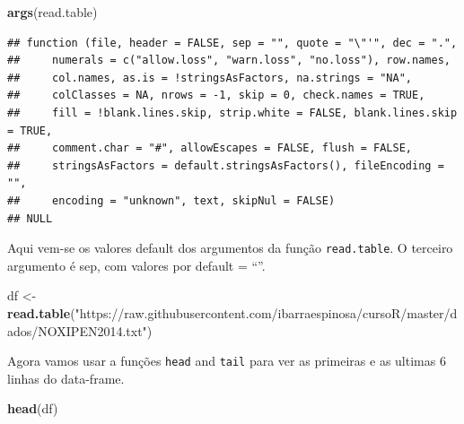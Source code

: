 \documentclass[]{book}
\newenvironment{Shaded}{\begin{snugshade}}{\end{snugshade}}
\newcommand{\KeywordTok}[1]{\textcolor[rgb]{0.13,0.29,0.53}{\textbf{#1}}}
\newcommand{\StringTok}[1]{\textcolor[rgb]{0.31,0.60,0.02}{#1}}
\newcommand{\NormalTok}[1]{#1}
\theoremstyle{definition}
\theoremstyle{definition}
\theoremstyle{definition}
\theoremstyle{remark}
\begin{document}
\begin{Shaded}
\begin{Highlighting}[]
\KeywordTok{args}\NormalTok{(read.table)}
\end{Highlighting}
\end{Shaded}

\begin{verbatim}
## function (file, header = FALSE, sep = "", quote = "\"'", dec = ".", 
##     numerals = c("allow.loss", "warn.loss", "no.loss"), row.names, 
##     col.names, as.is = !stringsAsFactors, na.strings = "NA", 
##     colClasses = NA, nrows = -1, skip = 0, check.names = TRUE, 
##     fill = !blank.lines.skip, strip.white = FALSE, blank.lines.skip = TRUE, 
##     comment.char = "#", allowEscapes = FALSE, flush = FALSE, 
##     stringsAsFactors = default.stringsAsFactors(), fileEncoding = "", 
##     encoding = "unknown", text, skipNul = FALSE) 
## NULL
\end{verbatim}

Aqui vem-se os valores default dos argumentos da função
\texttt{read.table}. O terceiro argumento é sep, com valores por default
= ``''.

\begin{Shaded}
\begin{Highlighting}[]
\NormalTok{df <-}\StringTok{ }\KeywordTok{read.table}\NormalTok{(}\StringTok{"https://raw.githubusercontent.com/ibarraespinosa/cursoR/master/dados/NOXIPEN2014.txt"}\NormalTok{)}
\end{Highlighting}
\end{Shaded}

Agora vamos usar a funções \texttt{head} and \texttt{tail} para ver as
primeiras e as ultimas 6 linhas do data-frame.

\begin{Shaded}
\begin{Highlighting}[]
\KeywordTok{head}\NormalTok{(df)}
\end{Highlighting}
\end{Shaded}
\end{document}
